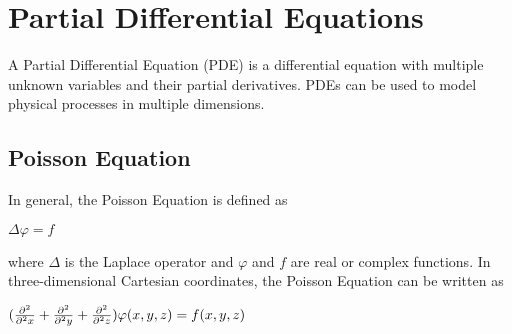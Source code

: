 \section*{Partial Differential Equations}

A Partial Differential Equation (PDE) is a differential equation with multiple 
unknown variables and their partial derivatives. PDEs can be used to model physical 
processes in multiple dimensions. 

\subsection*{Poisson Equation}

In general, the Poisson Equation is defined as 

$\Delta \varphi = f$

where $\Delta$ is the Laplace operator and $\varphi$ and $f$ are real or complex 
functions. In three-dimensional Cartesian coordinates, the Poisson Equation can 
be written as 

$(\frac{\partial^2}{\partial^2 x} + \frac{\partial^2}{\partial^2 y} + \frac{\partial^2}{\partial^2 z}) \varphi (x, y, z) = f(x, y, z)$

